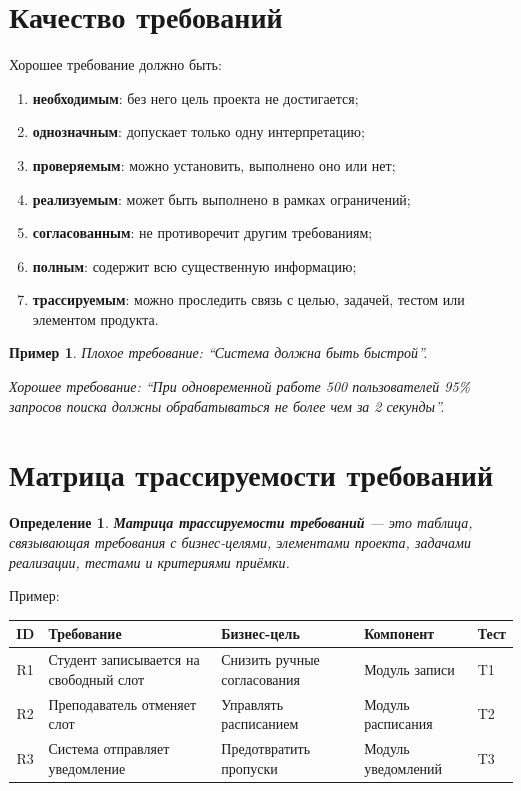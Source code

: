 \documentclass[12pt,a4paper]{article}
\newtheorem{definition}{Определение}
\newtheorem{example}{Пример}
\begin{document}
\section{Качество требований}

Хорошее требование должно быть:
\begin{enumerate}
    \item \textbf{необходимым}: без него цель проекта не достигается;
    \item \textbf{однозначным}: допускает только одну интерпретацию;
    \item \textbf{проверяемым}: можно установить, выполнено оно или нет;
    \item \textbf{реализуемым}: может быть выполнено в рамках ограничений;
    \item \textbf{согласованным}: не противоречит другим требованиям;
    \item \textbf{полным}: содержит всю существенную информацию;
    \item \textbf{трассируемым}: можно проследить связь с целью, задачей, тестом или элементом продукта.
\end{enumerate}

\begin{example}
Плохое требование: ``Система должна быть быстрой''.

Хорошее требование: ``При одновременной работе 500 пользователей 95\% запросов поиска должны обрабатываться не более чем за 2 секунды''.
\end{example}

\section{Матрица трассируемости требований}

\begin{definition}
\textbf{Матрица трассируемости требований} --- это таблица, связывающая требования с бизнес-целями, элементами проекта, задачами реализации, тестами и критериями приёмки.
\end{definition}

Пример:

\begin{center}
\begin{tabular}{|c|p{4cm}|p{3cm}|p{3cm}|p{3cm}|}
\hline
ID & Требование & Бизнес-цель & Компонент & Тест \\
\hline
R1 & Студент записывается на свободный слот & Снизить ручные согласования & Модуль записи & T1 \\
\hline
R2 & Преподаватель отменяет слот & Управлять расписанием & Модуль расписания & T2 \\
\hline
R3 & Система отправляет уведомление & Предотвратить пропуски & Модуль уведомлений & T3 \\
\hline
\end{tabular}
\end{center}
\end{document}

